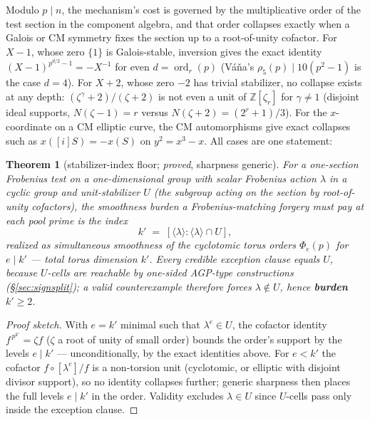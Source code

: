 \documentclass[11pt]{article}
\newtheorem{theorem}{Theorem}[section]
\theoremstyle{remark}
\newcommand{\Z}{\mathbb{Z}}
\DeclareMathOperator{\ord}{ord}
\begin{document}
Modulo $p \mid n$, the mechanism's cost is governed by the multiplicative
order of the test section in the component algebra, and that order
collapses exactly when a Galois or CM symmetry fixes the section up to a
root-of-unity cofactor. For $X - 1$, whose zero $\{1\}$ is Galois-stable,
inversion gives the exact identity $(X-1)^{p^{d/2}-1} = -X^{-1}$ for even
$d = \ord_r(p)$ (V\'a\v{n}a's $\rho_5(p) \mid 10(p^2-1)$ \cite{Vana09} is
the case $d = 4$). For $X + 2$, whose zero $-2$ has trivial stabilizer, no
collapse exists at any depth: $(\zeta^\gamma + 2)/(\zeta + 2)$ is not even
a unit of $\Z[\zeta_r]$ for $\gamma \ne 1$ (disjoint ideal supports,
$N(\zeta - 1) = r$ versus $N(\zeta + 2) = (2^r + 1)/3$). For the
$x$-coordinate on a CM elliptic curve, the CM automorphisms give exact
collapses such as $x([i]S) = -x(S)$ on $y^2 = x^3 - x$. All cases are one
statement:

\begin{theorem}[stabilizer-index floor; \emph{proved}, sharpness generic]
\label{thm:stabindex}
For a one-section Frobenius test on a one-dimensional group with scalar
Frobenius action $\lambda$ in a cyclic group and unit-stabilizer $U$ (the
subgroup acting on the section by root-of-unity cofactors), the smoothness
burden a Frobenius-matching forgery must pay at each pool prime is the
index
\[
k' \;=\; [\langle\lambda\rangle : \langle\lambda\rangle \cap U],
\]
realized as simultaneous smoothness of the cyclotomic torus orders
$\Phi_e(p)$ for $e \mid k'$ --- total torus dimension $k'$. Every credible
exception clause equals $U$, because $U$-cells are reachable by one-sided
AGP-type constructions (\S\ref{sec:signsplit}); a valid counterexample
therefore forces $\lambda \notin U$, hence \textbf{burden $k' \ge 2$}.
\end{theorem}

\begin{proof}[Proof sketch]
With $e = k'$ minimal such that $\lambda^e \in U$, the cofactor identity
$f^{\,p^{k'}} = \zeta f$ ($\zeta$ a root of unity of small order) bounds
the order's support by the levels $e \mid k'$ --- unconditionally, by the
exact identities above. For $e < k'$ the cofactor $f \circ [\lambda^e]/f$
is a non-torsion unit (cyclotomic, or elliptic with disjoint divisor
support), so no identity collapses further; generic sharpness then places
the full levels $e \mid k'$ in the order. Validity excludes
$\lambda \in U$ since $U$-cells pass only inside the exception clause.
\end{proof}
\end{document}

